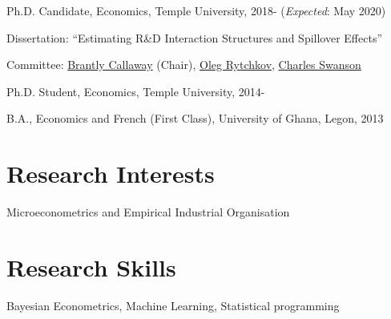 \documentclass[12pt,letterpaper]{article}
\renewenvironment{itemize}{
  \begin{list}{}{
    \setlength{\leftmargin}{1.5em}
  }
}{
  \end{list}
}
\begin{document}
\begin{itemize}
  \item Ph.D. Candidate, Economics, Temple University, 2018- (\textit{Expected}: May 2020)

  \begin{itemize}
    \item Dissertation: ``Estimating R\&D Interaction Structures and Spillover Effects''
    \item Committee:   \href{https://bcallaway11.github.io/index.html}
    {Brantly Callaway} (Chair), \href{https://astro.temple.edu/~rytchkov/}{Oleg Rytchkov}, \href{https://liberalarts.temple.edu/academics/faculty/swanson-charles}{Charles Swanson} 
  \end{itemize}

	\item Ph.D. Student, Economics, Temple University, 2014-

  \item B.A., Economics and French (First Class), University of Ghana, Legon, 2013
\end{itemize}

\section*{Research Interests}
\begin{itemize}
  \item Microeconometrics and Empirical Industrial Organisation
\end{itemize}

\section*{Research Skills}
\begin{itemize}
	\item Bayesian Econometrics, Machine Learning, Statistical programming
\end{itemize}
\end{document}
